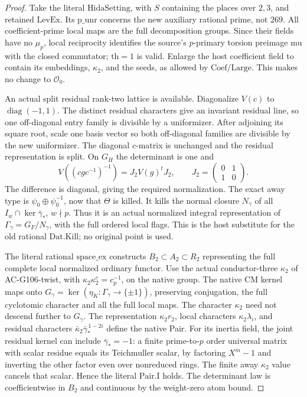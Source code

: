 \begin{proof}
Take the literal \(\mathrm{HidaSetting}\), with \(S\) containing
the places over \(2,3\), and retained \(\mathrm{LevEx}\).
Its \(\mathrm{p\_unr}\) concerns the new auxiliary rational
prime, not \(269\).  All coefficient-prime local maps are
the full decomposition groups.
Since their fields have no \(\mu_p\), local reciprocity
identifies the source's \(p\)-primary torsion preimage
\(\mathrm{mu}\) with the closed commutator; \(\mathrm{th}=1\)
is valid.  Enlarge the host coefficient field to contain its
embeddings, \(\kappa_2\), and the seeds, as allowed by
\(\mathrm{Coef}/\mathrm{Large}\).  This makes no change to
\(\mathcal O_0\).

An actual split residual rank-two lattice is available.
Diagonalize \(V(c)\) to \(\operatorname{diag}(-1,1)\).
The distinct residual characters give an invariant residual
line, so one off-diagonal entry family is divisible by a
uniformizer.  After adjoining its square root, scale one
basis vector so both off-diagonal families are divisible
by the new uniformizer.  The diagonal \(c\)-matrix is
unchanged and the residual representation is split.
On \(G_H\) the determinant is one and
\[
 V((cgc^{-1})^{-1})=J_2V(g)^tJ_2,\qquad
             J_2=\begin{pmatrix}0&1\\1&0\end{pmatrix}.
 \tag{G132.23}
\]
The difference is diagonal, giving the required normalization.
The exact away type is \(\psi_0\oplus\psi_0^{-1}\), now that
\(\Theta\) is killed.  It kills the normal closure \(N_\gamma\)
of all \(I_w\cap\ker\bar\gamma_*\), \(w\nmid p\).
Thus it is an actual normalized integral representation of
\(\Gamma_\gamma=G_F/N_\gamma\), with the full ordered local
flags.  This is the host substitute for the old rational
\(\mathrm{Dat.Kill}\); no original point is used.

The literal rational \(\mathrm{space\_ex}\) constructs
\(B_2\subset A_2\subset R_2\) representing the full complete
local normalized ordinary functor.
Use the actual conductor-three \(\kappa_2\) of AC-G106-twist,
with \(\kappa_2\kappa_2^c=c_p^{-1}\), on the native group.
The native CM kernel maps onto
\(G_\gamma=\ker(\eta_K:\Gamma_\gamma\to\{\pm1\})\),
preserving conjugation, the full cyclotomic character and
all the full local maps.  The character \(\kappa_2\) need
not descend further to \(G_\gamma\).
The representation \(\kappa_2r_2\), local characters
\(\kappa_2\lambda_i\), and residual characters
\(\bar\kappa_2\bar\gamma_*^{\,1-2i}\) define the native Pair.
For its inertia field, the joint residual kernel can include
\(\bar\gamma_*=-1\): a finite prime-to-\(p\) order universal
matrix with scalar residue equals its Teichmuller scalar,
by factoring \(X^m-1\) and inverting the other factor even
over nonreduced rings.  The finite away \(\kappa_2\) value
cancels that scalar.  Hence the literal \(\mathrm{Pair.I}\)
holds.  The determinant law is coefficientwise in \(B_2\)
and continuous by the weight-zero atom bound.


\end{proof}

